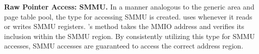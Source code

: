 \textbf{Raw Pointer Access: SMMU.}
In a manner analogous to the generic area and page table pool, the type
 for accessing SMMU is created.
\rustcore{} uses  whenever it reads or writes SMMU registers.
's  method takes the MMIO address and
verifies its inclusion within the SMMU region.
By consistently utilizing this type for SMMU accesses, SMMU accesses are
guaranteed to access the correct address region.
